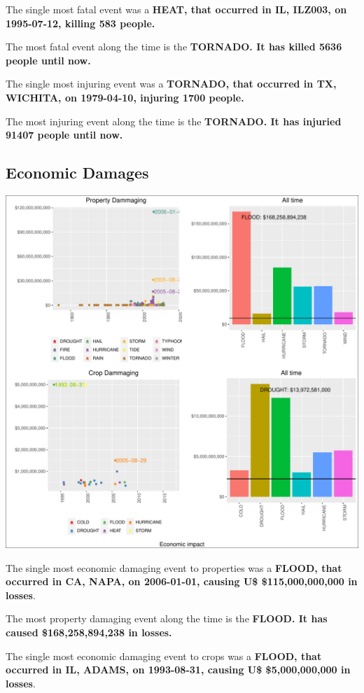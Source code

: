 \documentclass[]{article}
\begin{document}
The single most fatal event was a \textbf{HEAT, that occurred in IL,
ILZ003, on 1995-07-12, killing 583 people.}

The most fatal event along the time is the \textbf{TORNADO. It has
killed 5636 people until now.}

The single most injuring event was a \textbf{TORNADO, that occurred in
TX, WICHITA, on 1979-04-10, injuring 1700 people.}

The most injuring event along the time is the \textbf{TORNADO. It has
injuried 91407 people until now.}

\subsection{Economic Damages}\label{economic-damages}

\includegraphics{readme_files/figure-latex/economic-plot-1.pdf}

The single most economic damaging event to properties was a
\textbf{FLOOD, that occurred in CA, NAPA, on 2006-01-01, causing U\$
\$115,000,000,000 in losses}.

The most property damaging event along the time is the \textbf{FLOOD. It
has caused \$168,258,894,238 in losses.}

The single most economic damaging event to crops was a \textbf{FLOOD,
that occurred in IL, ADAMS, on 1993-08-31, causing U\$ \$5,000,000,000
in losses}.
\end{document}
